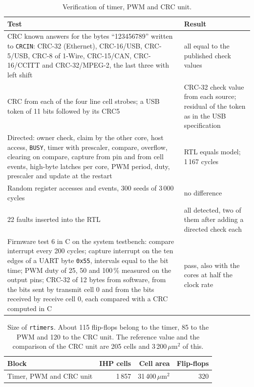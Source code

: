 \documentclass[10pt,a4paper]{article}
\newcommand{\reg}[1]{\texttt{#1}}
\begin{document}
\begin{table}[H]
\centering\small
\begin{tabularx}{\linewidth}{@{}LL@{}}
\toprule
Test & Result \\
\midrule
CRC known answers for the bytes ``123456789'' written to \reg{CRCIN}: CRC-32 (Ethernet), CRC-16/USB, CRC-5/USB, CRC-8 of 1-Wire, CRC-15/CAN, CRC-16/CCITT and CRC-32/MPEG-2, the last three with left shift & all equal to the published check values \\
CRC from each of the four line cell strobes; a USB token of 11 bits followed by its CRC5 & CRC-32 check value from each source; residual of the token as in the USB specification \\
Directed: owner check, claim by the other core, host access, \reg{BUSY}, timer with prescaler, compare, overflow, clearing on compare, capture from pin and from cell events, high-byte latches per core, PWM period, duty, prescaler and update at the restart & RTL equals model; 1\,167 cycles \\
Random register accesses and events, 300 seeds of 3\,000 cycles & no difference \\
22 faults inserted into the RTL & all detected, two of them after adding a directed check each \\
Firmware test 6 in C on the system testbench: compare interrupt every 200 cycles; capture interrupt on the ten edges of a UART byte \texttt{0x55}, intervals equal to the bit time; PWM duty of 25, 50 and 100\,\% measured on the output pins; CRC-32 of 12 bytes from software, from the bits sent by transmit cell 0 and from the bits received by receive cell 0, each compared with a CRC computed in C & pass, also with the cores at half the clock rate \\
\bottomrule
\end{tabularx}
\caption{Verification of timer, PWM and CRC unit.}
\end{table}

\begin{table}[H]
\centering\small
\begin{tabular}{@{}lrrr@{}}
\toprule
Block & IHP cells & Cell area & Flip-flops \\
\midrule
Timer, PWM and CRC unit & 1\,857 & 31\,400\,$\mu$m$^2$ & 320 \\
\bottomrule
\end{tabular}
\caption{Size of \texttt{rtimers}. About 115 flip-flops belong to the timer, 85 to the PWM and 120 to the CRC unit. The reference value and the comparison of the CRC unit are 205 cells and 3\,200\,$\mu$m$^2$ of this.}
\end{table}
\end{document}
